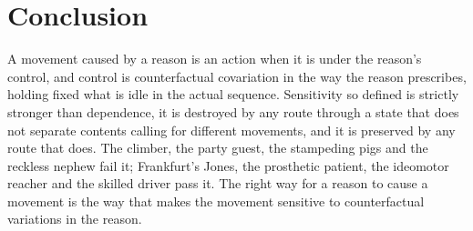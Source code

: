 \documentclass{situationist-preprint}
\begin{document}
\section{Conclusion}

A movement caused by a reason is an action when it is under the reason's control, and control is counterfactual covariation in the way the reason prescribes, holding fixed what is idle in the actual sequence. Sensitivity so defined is strictly stronger than dependence, it is destroyed by any route through a state that does not separate contents calling for different movements, and it is preserved by any route that does. The climber, the party guest, the stampeding pigs and the reckless nephew fail it; Frankfurt's Jones, the prosthetic patient, the ideomotor reacher and the skilled driver pass it. The right way for a reason to cause a movement is the way that makes the movement sensitive to counterfactual variations in the reason.
\end{document}
